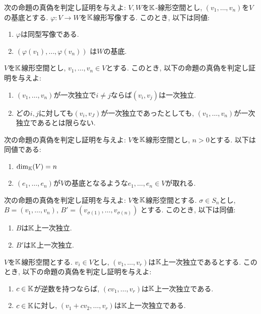 \begin{quiz}
  次の命題の真偽を判定し証明を与えよ:
  $V,W$を$\mathbb{K}$-線形空間とし,
  $(v_1,\ldots,v_n)$を$V$の基底とする.
  $\varphi\colon V\to W$を$\mathbb{K}$線形写像する.
  このとき, 以下は同値:
  \begin{enumerate}
  \item
    $\varphi$は同型写像である.
  \item
    $(\varphi(v_1),\ldots,\varphi(v_n))$
    は$W$の基底.
  \end{enumerate}
\end{quiz}


\begin{quiz}
$V$を$\mathbb{K}$線形空間とし, $v_1,\ldots,v_n\in V$とする.
  このとき,
  以下の命題の真偽を判定し証明を与えよ:
  \begin{enumerate}
  \item
    $(v_1,\ldots,v_n)$が一次独立で$i\neq j$ならば$(v_i,v_j)$は一次独立.
  \item
    どの$i,j$に対しても$(v_i,v_J)$が一次独立であったとしても,
    $(v_1,\ldots,v_n)$が一次独立であるとは限らない.
  \end{enumerate}
\end{quiz}


\begin{quiz}
  次の命題の真偽を判定し証明を与えよ:
  $V$を$\mathbb{K}$線形空間とし, $n>0$とする.
  以下は同値である:
  \begin{enumerate}
  \item $\dim_{\mathbb{K}}(V)=n$
  \item $(e_1,\ldots,e_n)$が$V$の基底となるような$e_1,\ldots,e_n\in V$が取れる.
  \end{enumerate}
\end{quiz}

\begin{quiz}
  次の命題の真偽を判定し証明を与えよ:
  $V$を$\mathbb{K}$線形空間とする.
  $\sigma\in S_n$とし,
  $B=(v_1,\ldots,v_n)$,
  $B'=(v_{\sigma(1)},\ldots,v_{\sigma(n)})$
  とする.
  このとき, 以下は同値:
  \begin{enumerate}
  \item
    $B$は$\mathbb{K}$上一次独立.
  \item
    $B'$は$\mathbb{K}$上一次独立.
  \end{enumerate}
\end{quiz}
\begin{quiz}
  $V$を$\mathbb{K}$線形空間とする.
  $v_i\in V$とし,
  $(v_1,\ldots, v_r)$は$\mathbb{K}$上一次独立であるとする.
  このとき,
  以下の命題の真偽を判定し証明を与えよ:
  \begin{enumerate}
  \item
    $c\in\mathbb{K}$が逆数を持つならば,
    $(cv_1,\ldots, v_r)$は$\mathbb{K}$上一次独立である.
  \item
    $c\in\mathbb{K}$に対し,
    $(v_1+cv_2,\ldots, v_r)$は$\mathbb{K}$上一次独立である.
  \end{enumerate}
\end{quiz}


